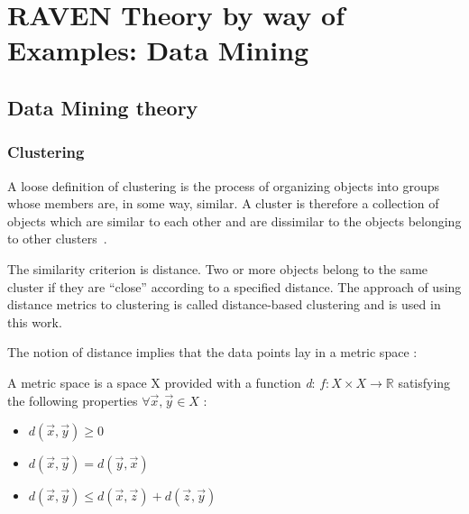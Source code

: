 \section{RAVEN Theory by way of Examples: Data Mining}

\subsection{Data Mining theory}
\label{sec:dataMining}

\subsubsection{Clustering}
\label{clustering}
A loose definition of clustering is the process of organizing objects into groups whose members are, in some way, similar.
A cluster is therefore a collection of objects which are similar to each other and are dissimilar to the objects belonging to other clusters~\cite{SurveyClustering,MandelliClusteringRESS}.

The similarity criterion is distance. Two or more objects belong to the same cluster if they are ``close'' according to a specified distance. The approach of using distance metrics to clustering is called distance-based clustering and is used in this work.

The notion of distance implies that the data points lay in a metric space \cite{Mendelson75introduction}:

    \begin{mydef}
    A metric space is a space X provided with a function \emph{d}:
    \begin{math}
    f: X\times X\rightarrow \mathbb{R}
    \end{math}
    satisfying the following properties \begin{math}\forall \vec{x},\vec{y} \in X \end{math} :

    \begin{itemize}
      \item \begin{math} d(\vec{x},\vec{y}) \geqslant 0 \end{math}
      \item \begin{math} d(\vec{x},\vec{y}) = d(\vec{y},\vec{x}) \end{math}
      \item \begin{math} d(\vec{x},\vec{y}) \leqslant d(\vec{x},\vec{z}) + d(\vec{z},\vec{y}) \end{math}
    \end{itemize}

    \end{mydef}

